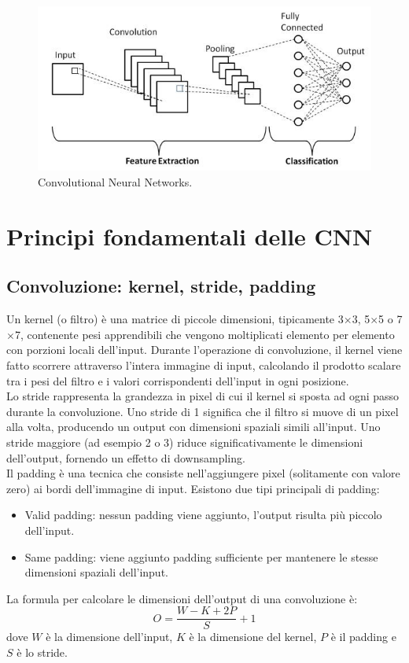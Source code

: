 \documentclass[a4paper,12pt]{report}
\begin{document}
	\begin{figure}[H]
		\centering
		\includegraphics[width=1.0\textwidth]{img/cnn.jpg}
		\caption{Convolutional Neural Networks.}
	\end{figure}
	
	\section{Principi fondamentali delle CNN}
	
	\subsection{Convoluzione: kernel, stride, padding}
	Un kernel (o filtro) è una matrice di piccole dimensioni, tipicamente 3$\times$3, 5$\times$5 o 7$\times$7, contenente pesi apprendibili che vengono moltiplicati elemento per elemento con porzioni locali dell'input. Durante l'operazione di convoluzione, il kernel viene fatto scorrere attraverso l'intera immagine di input, calcolando il prodotto scalare tra i pesi del filtro e i valori corrispondenti dell'input in ogni posizione. \\
	Lo stride rappresenta la grandezza in pixel di cui il kernel si sposta ad ogni passo durante la convoluzione. Uno stride di 1 significa che il filtro si muove di un pixel alla volta, producendo un output con dimensioni spaziali simili all'input. Uno stride maggiore (ad esempio 2 o 3) riduce significativamente le dimensioni dell'output, fornendo un effetto di downsampling. \\
	Il padding è una tecnica che consiste nell'aggiungere pixel (solitamente con valore zero) ai bordi dell'immagine di input. Esistono due tipi principali di padding:
	\begin{itemize}
		\item Valid padding: nessun padding viene aggiunto, l'output risulta più piccolo dell'input.
		\item Same padding: viene aggiunto padding sufficiente per mantenere le stesse dimensioni spaziali dell'input.
	\end{itemize}
	La formula per calcolare le dimensioni dell'output di una convoluzione è:
	$$O = \frac{W - K + 2P}{S} + 1$$
	dove $W$ è la dimensione dell'input, $K$ è la dimensione del kernel, $P$ è il padding e $S$ è lo stride.
	
\end{document}
